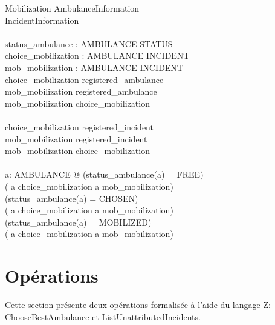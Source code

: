 \documentclass{report}
\begin{document}
\begin{schema}{Mobilization}
	AmbulanceInformation \\
	IncidentInformation \\
	\newline \\
	status\_ambulance : AMBULANCE \pfun STATUS \\
	choice\_mobilization : AMBULANCE \pinj INCIDENT \\
	mob\_mobilization : AMBULANCE \pinj INCIDENT \\
  \where
  	\dom choice\_mobilization \subseteq registered\_ambulance \\
	\dom mob\_mobilization \subseteq registered\_ambulance \\
	\dom mob\_mobilization  \subseteq \dom choice\_mobilization \\
	\newline \\
	\ran choice\_mobilization \subseteq registered\_incident \\
	\ran mob\_mobilization \subseteq registered\_incident \\
	\ran mob\_mobilization  \subseteq \ran choice\_mobilization \\
	\newline \\
	\forall a: AMBULANCE @ 
			(status\_ambulance(a) = FREE) \equiv \\
	                        ( a \notin \dom choice\_mobilization \land a \notin \dom mob\_mobilization) \\
	                   \land
	                   (status\_ambulance(a) = CHOSEN) \equiv \\
	                        ( a \in \dom choice\_mobilization \land a \notin \dom mob\_mobilization) \\
	                     \land
	                   (status\_ambulance(a) = MOBILIZED) \equiv \\
	                        ( a \in \dom choice\_mobilization \land a \in \dom mob\_mobilization) \\
  	
\end{schema}

\section{Opérations}\label{sec:op}

Cette section présente deux opérations formalisée à l'aide du langage Z:
ChooseBestAmbulance et ListUnattributedIncidents.
\end{document}
